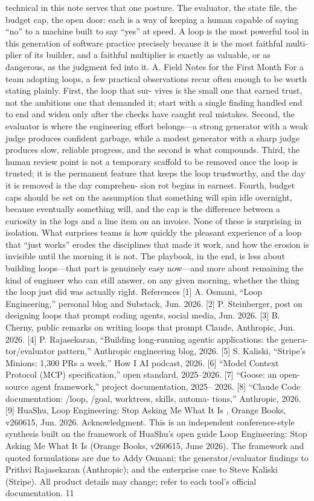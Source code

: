 \documentclass[conference]{IEEEtran}
\begin{document}

technical in this note serves that one posture. The evaluator, the
state file, the budget cap, the open door: each is a way of keeping
a human capable of saying “no” to a machine built to say “yes”
at speed. A loop is the most powerful tool in this generation of
software practice precisely because it is the most faithful multi-
plier of its builder, and a faithful multiplier is exactly as valuable,
or as dangerous, as the judgment fed into it.
A. Field Notes for the First Month
For a team adopting loops, a few practical observations recur
often enough to be worth stating plainly. First, the loop that sur-
vives is the small one that earned trust, not the ambitious one that
demanded it; start with a single finding handled end to end and
widen only after the checks have caught real mistakes. Second,
the evaluator is where the engineering effort belongs—a strong
generator with a weak judge produces confident garbage, while
a modest generator with a sharp judge produces slow, reliable
progress, and the second is what compounds. Third, the human
review point is not a temporary scaffold to be removed once the
loop is trusted; it is the permanent feature that keeps the loop
trustworthy, and the day it is removed is the day comprehen-
sion rot begins in earnest. Fourth, budget caps should be set on
the assumption that something will spin idle overnight, because
eventually something will, and the cap is the difference between
a curiosity in the logs and a line item on an invoice.
None of these is surprising in isolation. What surprises teams
is how quickly the pleasant experience of a loop that “just works”
erodes the disciplines that made it work, and how the erosion is
invisible until the morning it is not. The playbook, in the end, is
less about building loops—that part is genuinely easy now—and
more about remaining the kind of engineer who can still answer,
on any given morning, whether the thing the loop just did was
actually right.
References
[1] A. Osmani, “Loop Engineering,” personal blog and Substack, Jun. 2026.
[2] P. Steinberger, post on designing loops that prompt coding agents, social
media, Jun. 2026.
[3] B. Cherny, public remarks on writing loops that prompt Claude, Anthropic,
Jun. 2026.
[4] P. Rajasekaran, “Building long-running agentic applications: the genera-
tor/evaluator pattern,” Anthropic engineering blog, 2026.
[5] S. Kaliski, “Stripe’s Minions: 1,300 PRs a week,” How I AI podcast, 2026.
[6] “Model Context Protocol (MCP) specification,” open standard, 2025–2026.
[7] “Goose: an open-source agent framework,” project documentation, 2025–
2026.
[8] “Claude Code documentation: /loop, /goal, worktrees, skills, automa-
tions,” Anthropic, 2026.
[9] HuaShu, Loop Engineering: Stop Asking Me What It Is , Orange Books,
v260615, Jun. 2026.
Acknowledgment. This is an independent conference-style synthesis built on
the framework of HuaShu’s open guide Loop Engineering: Stop Asking Me
What It Is (Orange Books, v260615, June 2026). The framework and quoted
formulations are due to Addy Osmani; the generator/evaluator findings to Prithvi
Rajasekaran (Anthropic); and the enterprise case to Steve Kaliski (Stripe). All
product details may change; refer to each tool’s official documentation.
11
\end{document}
